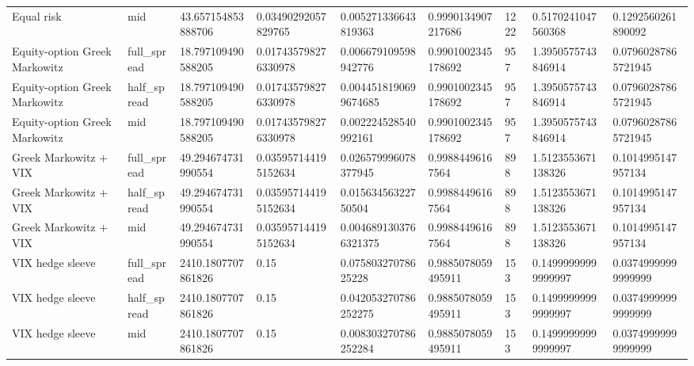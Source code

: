 \begin{tabular}{lllllllll}
Equal risk & mid & 43.657154853888706 & 0.03490292057829765 & 0.005271336643819363 & 0.9990134907217686 & 1222 & 0.5170241047560368 & 0.1292560261890092 \\
Equity-option Greek Markowitz & full\_spread & 18.797109490588205 & 0.017435798276330978 & 0.006679109598942776 & 0.9901002345178692 & 957 & 1.3950575743846914 & 0.07960287865721945 \\
Equity-option Greek Markowitz & half\_spread & 18.797109490588205 & 0.017435798276330978 & 0.0044518190699674685 & 0.9901002345178692 & 957 & 1.3950575743846914 & 0.07960287865721945 \\
Equity-option Greek Markowitz & mid & 18.797109490588205 & 0.017435798276330978 & 0.002224528540992161 & 0.9901002345178692 & 957 & 1.3950575743846914 & 0.07960287865721945 \\
Greek Markowitz + VIX & full\_spread & 49.294674731990554 & 0.035957144195152634 & 0.026579996078377945 & 0.99884496167564 & 898 & 1.5123553671138326 & 0.1014995147957134 \\
Greek Markowitz + VIX & half\_spread & 49.294674731990554 & 0.035957144195152634 & 0.01563456322750504 & 0.99884496167564 & 898 & 1.5123553671138326 & 0.1014995147957134 \\
Greek Markowitz + VIX & mid & 49.294674731990554 & 0.035957144195152634 & 0.0046891303766321375 & 0.99884496167564 & 898 & 1.5123553671138326 & 0.1014995147957134 \\
VIX hedge sleeve & full\_spread & 2410.1807707861826 & 0.15 & 0.07580327078625228 & 0.9885078059495911 & 153 & 0.14999999999999997 & 0.03749999999999999 \\
VIX hedge sleeve & half\_spread & 2410.1807707861826 & 0.15 & 0.042053270786252275 & 0.9885078059495911 & 153 & 0.14999999999999997 & 0.03749999999999999 \\
VIX hedge sleeve & mid & 2410.1807707861826 & 0.15 & 0.008303270786252284 & 0.9885078059495911 & 153 & 0.14999999999999997 & 0.03749999999999999 \\
\bottomrule
\end{tabular}
